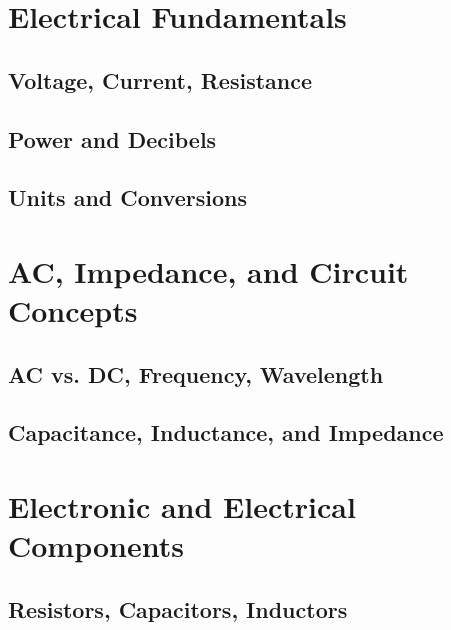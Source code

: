 \documentclass[12pt]{book}
\begin{document}
\chapter{Electrical Fundamentals}
\section{Voltage, Current, Resistance}


\section{Power and Decibels}

\section{Units and Conversions}

\chapter{AC, Impedance, and Circuit Concepts}
\section{AC vs. DC, Frequency, Wavelength}


\section{Capacitance, Inductance, and Impedance}





\chapter{Electronic and Electrical Components}
\section{Resistors, Capacitors, Inductors}

\end{document}
